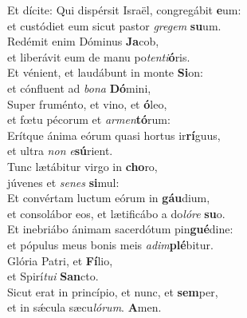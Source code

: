 \evenverse Et dícite: Qui dispérsit Israël, congregábit \textbf{e}um:~\*\\
\evenverse et custódiet eum sicut pastor \textit{gre}\textit{gem} \textbf{su}um.\\
\oddverse Redémit enim Dóminus \textbf{Ja}cob,~\*\\
\oddverse et liberávit eum de manu po\textit{ten}\textit{ti}\textbf{ó}ris.\\
\evenverse Et vénient, et laudábunt in monte \textbf{Si}on:~\*\\
\evenverse et cónfluent ad \textit{bo}\textit{na} \textbf{Dó}mini,\\
\oddverse Super fruménto, et vino, et \textbf{ó}leo,~\*\\
\oddverse et fœtu pécorum et \textit{ar}\textit{men}\textbf{tó}rum:\\
\evenverse Erítque ánima eórum quasi hortus ir\textbf{rí}guus,~\*\\
\evenverse et ultra \textit{non} \textit{e}\textbf{sú}rient.\\
\oddverse Tunc lætábitur virgo in \textbf{cho}ro,~\*\\
\oddverse júvenes et \textit{se}\textit{nes} \textbf{si}mul:\\
\evenverse Et convértam luctum eórum in \textbf{gáu}dium,~\*\\
\evenverse et consolábor eos, et lætificábo a do\textit{ló}\textit{re} \textbf{su}o.\\
\oddverse Et inebriábo ánimam sacerdótum pin\textbf{gué}dine:~\*\\
\oddverse et pópulus meus bonis meis \textit{a}\textit{dim}\textbf{plé}bitur.\\
\evenverse Glória Patri, et \textbf{Fí}lio,~\*\\
\evenverse et Spirí\textit{tu}\textit{i} \textbf{San}cto.\\
\oddverse Sicut erat in princípio, et nunc, et \textbf{sem}per,~\*\\
\oddverse et in sǽcula sæcu\textit{ló}\textit{rum}. \textbf{A}men.\\
